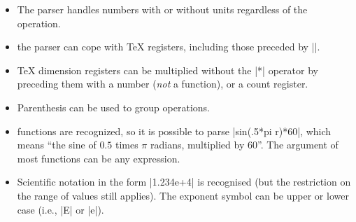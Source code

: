 \begin{command}{\pgfmathparse{}}
\begin{itemize}
  \item The parser handles numbers with or without units regardless
    of the operation.

\begin{codeexample}[]
 \pgfmathresult
\end{codeexample}

  \item the parser can cope with \TeX{} registers, including those 
    preceded by |\the|.

    \makeatletter

\begin{codeexample}[]
\pgf@x=12.34pt
 \pgfmathresult
\end{codeexample}

\begin{codeexample}[]
\pgf@x=56.78pt
\pgfmathparse{\pgf@x+\the\pgf@x} \pgfmathresult
\end{codeexample}

  \item \TeX{} dimension registers can be multiplied without the |*| 
    operator by preceding them with a number (\emph{not} a function),
     or a count register.
	 
\begin{codeexample}[]
\pgf@x=10pt
 \pgfmathresult
\end{codeexample}

  \item Parenthesis can be used to group operations.

\begin{codeexample}[]
 \pgfmathresult
\end{codeexample}

  \item functions are recognized, so it is possible to parse
    |sin(.5*pi r)*60|, which means ``the sine of $0.5$ times $\pi$ 
    radians, multiplied by 60''. The argument of most functions can
    be any expression.

\begin{codeexample}[]
 \pgfmathresult
\end{codeexample}

  \item Scientific notation in the form |1.234e+4| is recognised (but
  the restriction on the range of values still applies). The exponent
  symbol can be upper or lower case (i.e., |E| or |e|). 
  
\begin{codeexample}[]
 \pgfmathresult
\end{codeexample}
\begin{codeexample}[]
 \pgfmathresult
\end{codeexample}
  \end{itemize}
\end{command}

